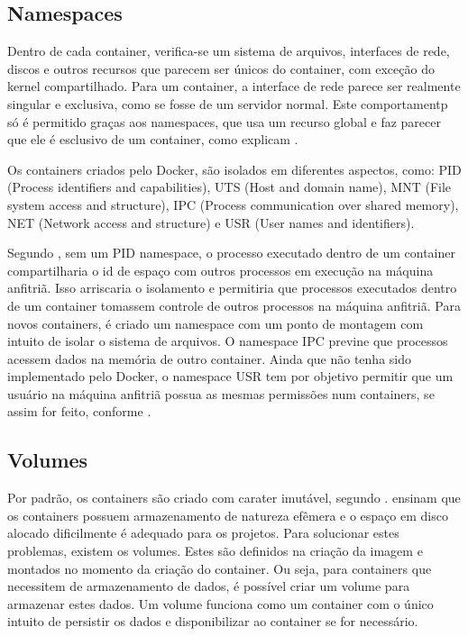\documentclass[
	12pt,				%
	openright,			%
	oneside,			%
	a4paper,			%
	chapter=TITLE,		%
	section=TITLE,		%
	english,			%
	french,				%
	spanish,			%
	brazil				%
	]{abntex2}
\begin{document}
\subsection{Namespaces}

Dentro de cada container, verifica-se um sistema de arquivos, interfaces de rede, discos e outros recursos que parecem ser únicos do container, com exceção do kernel compartilhado. Para um container, a interface de rede parece ser realmente singular e exclusiva, como se fosse de um servidor normal. Este comportamentp só é permitido graças aos namespaces, que usa um recurso global e faz parecer que ele é esclusivo de um container, como explicam .

Os containers criados pelo Docker, são isolados em diferentes aspectos, como: PID (Process identifiers and capabilities), UTS (Host and domain name), MNT (File system access and structure), IPC (Process communication over shared memory), NET (Network access and structure) e USR (User names and identifiers). 

Segundo , sem um PID namespace, o processo executado dentro de um container compartilharia o id de espaço com outros processos em execução na máquina anfitriã. Isso arriscaria o isolamento e permitiria que processos executados dentro de um container tomassem controle de outros processos na máquina anfitriã. Para novos containers, é criado um namespace com um ponto de montagem com intuito de isolar o sistema de arquivos. O namespace IPC previne que processos acessem dados na memória de outro container. Ainda que não tenha sido implementado pelo Docker, o namespace USR tem por objetivo permitir que um usuário na máquina anfitriã possua as mesmas permissões num containers, se assim for feito, conforme . 

\subsection{Volumes}

Por padrão, os containers são criado com carater imutável, segundo .  ensinam que os containers possuem armazenamento de natureza efêmera e o espaço em disco alocado dificilmente é adequado para os projetos. Para solucionar estes problemas, existem os volumes. Estes são definidos na criação da imagem e montados no momento da criação do container. Ou seja, para containers que necessitem de armazenamento de dados, é possível criar um volume para armazenar estes dados. Um volume funciona como um container com o único intuito de persistir os dados e disponibilizar ao container se for necessário.
\end{document}

